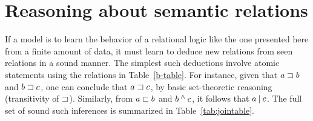 
\section{Reasoning about semantic relations}\label{sec:join}

If a model is to learn the behavior of a relational logic like the one
presented here from a finite amount of data, it must learn to deduce new
relations from seen relations in a sound manner. The simplest such
deductions involve atomic statements using the relations in
Table~\ref{b-table}. For instance, given that $a \sqsupset b$ and $b
\sqsupset c$, one can conclude that $a \sqsupset c$, by basic
set-theoretic reasoning (transitivity of $\sqsupset$). Similarly, from
$a \sqsubset b$ and $b \mathbin{^{\wedge}} c$, it follows that $a \mathbin{|} c$.  The
full set of sound such inferences is summarized in
Table~\ref{tab:jointable}.


